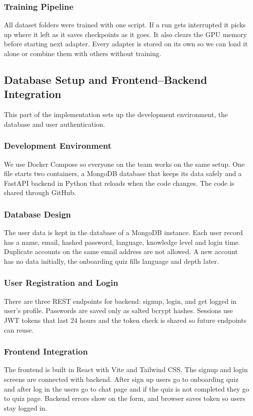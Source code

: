 \documentclass{FastFyp}
\begin{document}
\subsubsection{Training Pipeline}
All dataset folders were trained with one script. If a run gets interrupted it picks up where it left as it saves checkpoints as it goes. It also clears the GPU memory before starting next adapter. Every adapter is stored on its own so we can load it alone or combine them with others without training.

\subsection{Database Setup and Frontend--Backend Integration}
\label{subsec:impl-db}
This part of the implementation sets up the development environment, the database and user authentication.

\subsubsection{Development Environment}
We use Docker Compose so everyone on the team works on the same setup. One file starts two containers, a MongoDB database that keeps its data safely and a FastAPI backend in Python that reloads when the code changes. The code is shared through GitHub.

\subsubsection{Database Design}
The user data is kept in the database of a MongoDB instance. Each user record has a name, email, hashed password, language, knowledge level and login time. Duplicate accounts on the same email address are not allowed. A new account has no data initially, the onboarding quiz fills language and depth later.

\subsubsection{User Registration and Login}
There are three REST endpoints for backend: signup, login, and get logged in user's profile. Passwords are saved only as salted bcrypt hashes. Sessions use JWT tokens that last 24 hours and the token check is shared so future endpoints can reuse.

\subsubsection{Frontend Integration}
The frontend is built in React with Vite and Tailwind CSS. The signup and login screens are connected with backend. After sign up users go to onboarding quiz and after log in the users go to chat page and if the quiz is not completed they go to quiz page. Backend errors show on the form, and browser saves token so users stay logged in.
\end{document}

